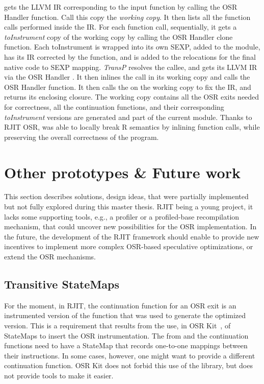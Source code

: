  gets the LLVM IR corresponding to the input function by calling the OSR Handler  function.
Call this copy the \textit{working copy}.
It then lists all the function calls performed inside the IR.
For each function call, sequentially, it gets a \textit{toInstrument} copy of the working copy by calling the OSR Handler clone function.
Each toInstrument is wrapped into its own SEXP, added to the module, has its IR corrected by the  function, and is added to the relocations for the final native code to SEXP mapping.
\textit{TransP} resolves the callee, and gets its LLVM IR via the OSR Handler .
It then inlines the call in its working copy and calls the OSR Handler  function.
It then calls the  on the working copy to fix the IR, and returns its enclosing closure.
The working copy contains all the OSR exits needed for correctness, all the continuation functions, and their corresponding \textit{toInstrument} versions are generated and part of the current module.
Thanks to RJIT OSR,  was able to locally break R semantics by inlining function calls, while preserving the overall correctness of the program.\\


\section{Other prototypes \& Future work}\label{section:futurework}
This section describes solutions, design ideas, that were partially implemented but not fully explored during this master thesis.
RJIT being a young project, it lacks some supporting tools, e.g., a profiler or a profiled-base recompilation mechanism, that could uncover new possibilities for the OSR implementation.
In the future, the development of the RJIT framework should enable to provide new incentives to implement more complex OSR-based speculative optimizations, or extend the OSR mechanisms.\\

\subsection{Transitive StateMaps}
For the moment, in RJIT, the continuation function for an OSR exit is an instrumented version of the function that was used to generate the optimized version.
This is a requirement that results from the use, in OSR Kit~\cite{OSRKit}, of StateMaps to insert the OSR instrumentation.
The from and the continuation functions need to have a StateMap that records one-to-one mappings between their instructions.
In some cases, however, one might want to provide a different continuation function.
OSR Kit does not forbid this use of the library, but does not provide tools to make it easier.\\  

